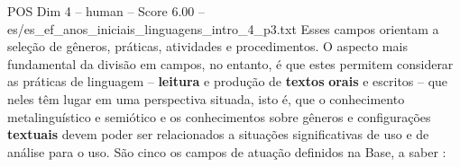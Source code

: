 \begin{textsample}{POS Dim 4 – human – Score 6.00 – es/es\_ef\_anos\_iniciais\_linguagens\_intro\_4\_p3.txt}  \label{ex:f4_pos_006}
Esses campos orientam a seleção de gêneros, práticas, atividades e procedimentos.
O aspecto mais fundamental da divisão em campos, no entanto, é que estes permitem considerar as práticas de linguagem – \textbf{leitura} e produção de \textbf{textos} \textbf{orais} e escritos – que neles têm lugar em uma perspectiva situada, isto é, que o conhecimento metalinguístico e semiótico e os conhecimentos sobre gêneros e configurações \textbf{textuais} devem poder ser relacionados a situações significativas de uso e de análise para o uso.
São cinco os campos de atuação definidos na Base, a saber :

\end{textsample}

